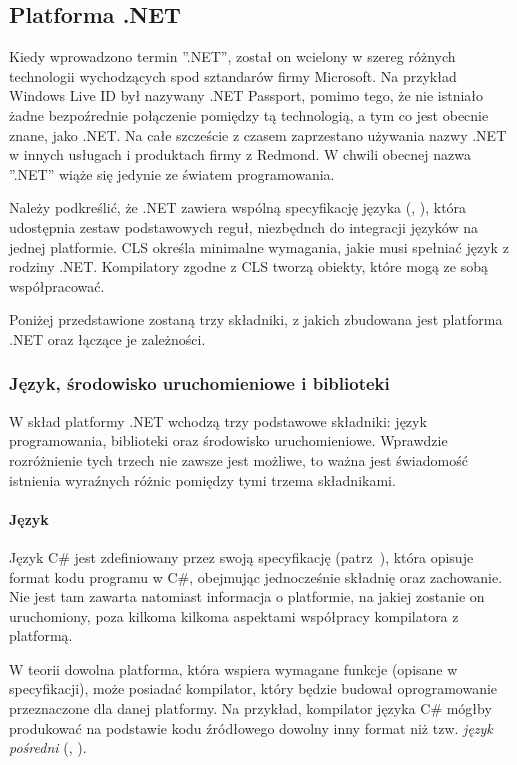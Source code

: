 \subsection{Platforma .NET}
Kiedy wprowadzono termin ''.NET'', został on wcielony w szereg różnych technologii wychodzących spod sztandarów firmy Microsoft. Na przykład Windows Live ID był nazywany .NET Passport, pomimo tego, że nie istniało żadne bezpoźrednie połączenie pomiędzy tą technologią, a tym co jest obecnie znane, jako .NET. Na całe szczeście z czasem zaprzestano używania nazwy .NET w innych usługach i produktach firmy z Redmond. W chwili obecnej nazwa ''.NET'' wiąże się jedynie ze światem programowania.

Należy podkreślić, że .NET zawiera wspólną specyfikację języka (, ), która udostępnia zestaw podstawowych reguł, niezbędnch do integracji języków na jednej platformie. CLS określa minimalne wymagania, jakie musi spełniać język z rodziny .NET. Kompilatory zgodne z CLS tworzą obiekty, które mogą ze sobą współpracować.

Poniżej przedstawione zostaną trzy składniki, z jakich zbudowana jest platforma .NET oraz łączące je zależności.

\subsubsection{Język, środowisko uruchomieniowe i biblioteki}
W skład platformy .NET wchodzą trzy podstawowe składniki: język programowania, biblioteki oraz środowisko uruchomieniowe. Wprawdzie rozróżnienie tych trzech nie zawsze jest możliwe, to ważna jest świadomość istnienia wyraźnych różnic pomiędzy tymi trzema składnikami.

\paragraph{Język}
Język C\# jest zdefiniowany przez swoją specyfikację (patrz~\cite{cSharp:spec}), która opisuje format kodu programu w C\#, obejmując jednocześnie składnię oraz zachowanie. Nie jest tam zawarta natomiast informacja o platformie, na jakiej zostanie on uruchomiony, poza kilkoma kilkoma aspektami współpracy kompilatora z platformą. 

W teorii dowolna platforma, która wspiera wymagane funkcje (opisane w specyfikacji), może posiadać kompilator, który będzie budował oprogramowanie przeznaczone dla danej platformy.  Na przykład, kompilator języka C\# mógłby produkować na podstawie kodu źródłowego dowolny inny format niż tzw. \emph{język pośredni} (, ).

